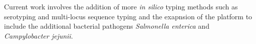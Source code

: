 \documentclass[doublespacing, linenumbers]{bmcart}
\begin{document}
Current work involves the addition of more \textit{in silico} typing methods such as serotyping and multi-locus sequence typing and the exapnsion of the platform to include the additional bacterial pathogens \textit{Salmonella enterica} and \textit{Campylobacter jejunii}. 
 

\end{document}
